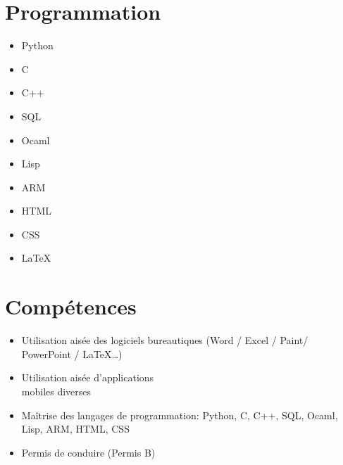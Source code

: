 \documentclass[9pt, oneside, a4paper, titlepage]{extarticle}
\begin{document}
\begin{tcolorbox}
\begin{minipage}[t]{6.2cm}
\begin{spacing}{0.95}
\begin{tcolorbox}[grow to left by = 0.6cm, colback = gray!25, colframe = white]
                \section*{Programmation}
                \begin{multicols}{2}
                    \begin{itemize}
                        \item Python
                        \item C
                        \item C++
                        \item SQL
                        \item Ocaml
                        \columnbreak                    
                        \item Lisp
                        \item ARM
                        \item HTML
                        \item CSS
                        \item \LaTeX
                    \end{itemize}
                    \end{multicols}
                    \vspace*{0.2cm}
                \section*{Compétences}

                \begin{itemize}
                    \vspace*{0.3cm}
                    \item Utilisation aisée des logiciels bureautiques (Word / Excel / Paint/ \\PowerPoint / \LaTeX \ldots)
                    \vspace*{0.2cm}
                    \item Utilisation aisée d’applications \\mobiles diverses
                    \vspace*{0.2cm}
                    \item Maîtrise des langages de programmation: Python, C, C++, SQL, Ocaml, Lisp, ARM, HTML, CSS\\
                    \vspace*{0.2cm}
                    \item Permis de conduire (Permis B)
                \end{itemize}



\end{tcolorbox}
\end{spacing}
\end{minipage}
\end{tcolorbox}
\end{document}
